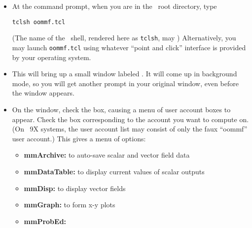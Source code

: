 \begin{list}{}{\setlength{\labelwidth}{0pt}
               \setlength{\leftmargin}{0pt}
               \setlength{\rightmargin}{\leftmargin}
               \setlength{\itemsep}{0pt}}
  \item {}
  \begin{itemize}
    \item At the command prompt, when you are in the \OOMMF\ root
          directory, type 
\begin{verbatim}
tclsh oommf.tcl
\end{verbatim}
    (The name of the \Tcl\ shell, rendered here as \verb+tclsh+, may
    )
    Alternatively, you may launch \verb+oommf.tcl+ using
    whatever ``point and click'' interface is provided by your operating
    system.
    \item This will bring up a small window labeled
          . It will come up in background mode, so you will get
          another prompt in your original window, even before the
           window appears.
  \end{itemize}
  \item {}
  \begin{itemize}
    \item On the  window, check the  box,
          causing a menu of user account boxes to appear.  Check
          the box corresponding to the account you want to compute on.
          (On \Windows~9X systems, the user account list may consist of
          only the faux ``oommf'' user account.)  This gives a menu of
          options:
    \begin{itemize}
       \item {\bf{mmArchive:}}
                   to auto-save scalar and vector field data
       \item {\bf{mmDataTable:}}
                   to display current values of scalar outputs
       \item {\bf{mmDisp:}}
                   to display vector fields
       \item {\bf{mmGraph:}}
                   to form x-y plots
       \item {\bf{mmProbEd:}}

\end{itemize}
\end{itemize}
\end{list}
